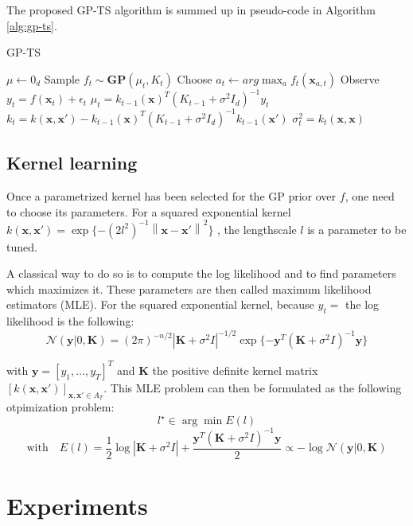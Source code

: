 \documentclass{article} %
\begin{document}
The proposed GP-TS algorithm is summed up in pseudo-code in Algorithm \ref{alg:gp-ts}.

\begin{algorithm}  
  \caption{GP-TS
    \label{alg:gp-ts}}  
  \begin{algorithmic}[1]  
    \State  $\mu \gets 0_d$
          \State  Sample $f_t \sim \mathbf{GP}(\mu_t, K_t) $
    \State Choose $a_t \gets arg \max_a f_t(\mathbf{x}_{a,t})$
    \State Observe $y_t = f(\mathbf{x}_t) + \epsilon_t$
    \State $\mu_t = k_{t-1}(\mathbf{x})^T {(K_{t-1} + \sigma^2 I_d)}^{-1} y_t$
    \State $k_t = k(\mathbf{x}, \mathbf{x}') - k_{t-1}(\mathbf{x})^T {(K_{t-1} + \sigma^2 I_d)}^{-1} k_{t-1}(\mathbf{x'}) $
    \State $\sigma_{t}^2 = k_t(\mathbf{x},\mathbf{x})$
      \EndFor  
  \end{algorithmic}  
\end{algorithm}

\subsection{Kernel learning\label{kernel_learning}}


Once a parametrized kernel has been selected for the GP prior over $f$, one need to choose its parameters. For a squared exponential kernel
$k(\mathbf{x}, \mathbf{x'}) = \exp \{ -(2l^2)^{-1} {\left\| \mathbf{x} - \mathbf{x'} \right\|}^2 \}$
, the lengthscale $l$ is a parameter to be tuned. 

A classical way to do so is to compute the log likelihood and to find parameters which maximizes it.
These parameters are then called maximum likelihood estimators (MLE).
For the squared exponential kernel, because $y_t =$ the log likelihood is the following:
$$ \mathcal{N}(\mathbf{y} | 0, \mathbf{K}) = {(2 \pi)}^{-n/2} {|\mathbf{K}+ \sigma^2I |}^{-1/2} \exp \{ -\mathbf{y}^T {(\mathbf{K}+ \sigma^2 I)}^{-1} \mathbf{y} \} $$

with $\mathbf{y}=[y_1, \dots, y_T]^T $ and $\mathbf{K}$ the positive definite kernel matrix $[k(\mathbf{x}, \mathbf{x'})]_{\mathbf{x}, \mathbf{x'} \in A_T}$.
This MLE problem can then be formulated as the following otpimization problem:
$$ l^\star \in \arg\min E(l) $$
$$ \text{with} \quad E(l) = \frac{1}{2} \log |\mathbf{K}+ \sigma^2 I | + \frac{\mathbf{y}^T {(\mathbf{K}+ \sigma^2 I)}^{-1} \mathbf{y}}{2} \propto -\log \mathcal{N}(\mathbf{y} | 0, \mathbf{K}) $$

\section{Experiments}
\end{document}
